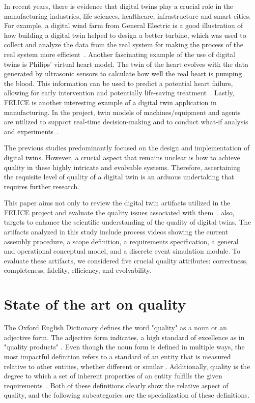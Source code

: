 \documentclass{llncs}
\begin{document}
    In recent years, there is evidence that digital twins play a crucial role in the manufacturing industries, 
    life sciences, healthcare, infrastructure and smart cities\cite{Review2}.
    For example, a digital wind farm from General Electric is a good illustration of how building a digital twin helped to design a better turbine, 
    which was used to collect and analyze the data from the real system for making the process of the real system more efficient~\cite{GeneralElectricWindTurbine}. 
    Another fascinating example of the use of digital twins is Philips' virtual heart model. The twin of the heart evolves with the data generated by ultrasonic sensors to calculate 
    how well the real heart is pumping the blood. This information can be used to predict a potential heart failure, allowing for early intervention and potentially life-saving treatment~\cite{PhilipsHearth}. 
    Lastly, FELICE is another interesting example of a digital twin application in manufacturing. In the project, twin models of machines/equipment and 
    agents are utilized to support real-time decision-making and to conduct what-if analysis and experiments~\cite{FELICE}.
    
    The previous studies predominantly focused on the design and implementation of digital twins\cite{Review1, Review2}. 
    However, a crucial aspect that remains unclear is how to achieve quality in these highly intricate and evolvable systems. 
    Therefore, ascertaining the requisite level of quality of a digital twin is an arduous undertaking that requires further research.

    This paper aims not only to review the digital twin artifacts utilized in the FELICE project and evaluate the quality issues associated with them~\cite{FELICE}. 
    also, targets to enhance the scientific understanding of the quality of digital twins. The artifacts analyzed in this study include process videos showing the current assembly procedure, 
    a scope definition, a requirements specification, a general and operational conceptual model, and a discrete event simulation module. 
    To evaluate these artifacts, we considered five crucial quality attributes: correctness, completeness, fidelity, efficiency, and evolvability.

    \section{State of the art on quality}
    The Oxford English Dictionary defines the word "quality" as a noun or an adjective form. The adjective form indicates, 
    a high standard of excellence as in  "quality products" \cite{OxfordDictionary}. Even though the noun form is defined in multiple ways, the most impactful 
    definition refers to a  standard of an entity that is measured relative to other entities, whether different or similar \cite{OxfordDictionary}.  
    Additionally, quality is the degree to which a set of inherent properties of an entity fulfills the given requirements~\cite{ISO9000}.
    Both of these definitions clearly show the relative aspect of quality, and the following subcategories are the specialization of these definitions.
\end{document}
